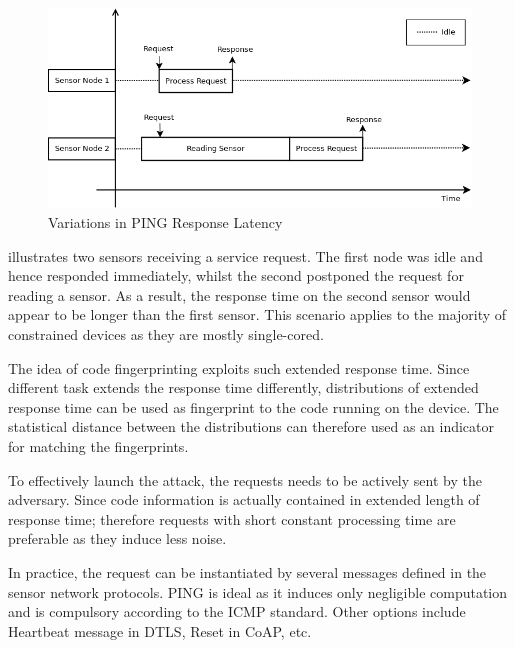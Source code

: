 \begin{figure}
	\center
	\includegraphics[width=\textwidth]{fig/PingProbe_Theory.png}
	\caption{Variations in PING Response Latency\label{FingerprintTheory}}
\end{figure}

 illustrates two sensors receiving a service request. The first node was idle and hence responded immediately, whilst the second postponed the request for reading a sensor. As a result, the response time on the second sensor would appear to be longer than the first sensor. This scenario applies to the majority of constrained devices as they are mostly single-cored. 

The idea of code fingerprinting exploits such extended response time. Since different task extends the response time differently, distributions of extended response time can be used as fingerprint to the code running on the device. The statistical distance between the distributions can therefore used as an indicator for matching the fingerprints.

To effectively launch the attack, the requests needs to be actively sent by the adversary. Since code information is actually contained in extended  length of response time; therefore requests with short constant processing time are preferable as they induce less noise. 

In practice, the request can be instantiated by several messages defined in the sensor network protocols. PING is ideal as it induces only negligible computation and is compulsory according to the ICMP standard\cite{rfc4433}. Other options include Heartbeat message in DTLS\cite{rfc6520}, Reset in CoAP\cite{rfc7252}, etc.

